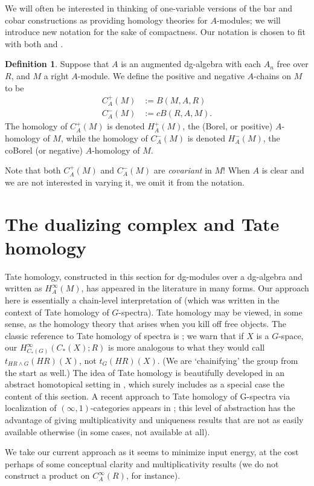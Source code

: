 \documentclass{memo-l}
\theoremstyle{definition}
\newtheorem{definition}[theorem]{Definition}
\theoremstyle{remark}
\numberwithin{section}{chapter}
\numberwithin{equation}{chapter}
\begin{document}
We will often be interested in thinking of one-variable versions of the bar and cobar constructions as providing homology theories for $A$-modules; we will introduce new notation for the sake of compactness. Our notation is chosen to fit with both \cite{Jones} and \cite{OS}.

\begin{definition}Suppose that $A$ is an augmented dg-algebra with each $A_n$ free over $R$, and $M$ a right $A$-module. We define the positive and negative $A$-chains on $M$ to be 
\begin{align*}C_A^+(M) &:= B(M,A,R)\\
C_A^-(M) &:= cB(R,A,M).\end{align*} 
The homology of $C_A^+(M)$ is denoted $H_A^+(M)$, the (Borel, or positive) $A$-homology of $M$, while the homology of $C_A^-(M)$ is denoted $H_A^-(M)$, the coBorel (or negative) $A$-homology of $M$. 
\end{definition}
Note that both $C^+_A(M)$ and $C^-_A(M)$ are \emph{covariant} in $M$! When $A$ is clear and we are not interested in varying it, we omit it from the notation.

\section{The dualizing complex and Tate homology}
Tate homology, constructed in this section for dg-modules over a dg-algebra and written as $H^\infty_A(M)$, has appeared in the literature in many forms. Our approach here is essentially a chain-level interpretation of \cite{Klein} (which was written in the context of Tate homology of $G$-spectra). Tate homology may be viewed, in some sense, as the homology theory that arises when you kill off free objects. The classic reference to Tate homology of spectra is \cite{GreM}; we warn that if $X$ is a $G$-space, our $H^\infty_{C_*(G)}(C_*(X);R)$ is more analogous to what they would call $t_{HR \wedge G}(HR)(X)$, not $t_G(HR)(X)$. (We are `chainifying' the group from the start as well.) The idea of Tate homology is beautifully developed in an abstract homotopical setting in \cite{Green}, which surely includes as a special case the content of this section. A recent approach to Tate homology of G-spectra via localization of $(\infty,1)$-categories appears in \cite{NS}; this level of abstraction has the advantage of giving multiplicativity and uniqueness results that are not as easily available otherwise (in some cases, not available at all).

We take our current approach as it seems to minimize input energy, at the cost perhaps of some conceptual clarity and multiplicativity results (we do not construct a product on $C^\infty_A(R)$, for instance).
\end{document}
